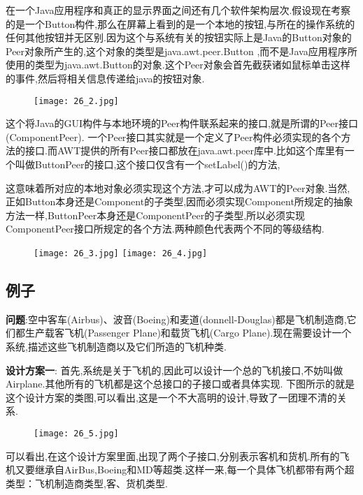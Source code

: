 \documentclass[../main.tex]{subfiles}
\begin{document}
在一个Java应用程序和真正的显示界面之间还有几个软件架构层次.假设现在考察的是一个Button构件,那么在屏幕上看到的是一个本地的按钮,与所在的操作系统的任何其他按钮并无区别.因为这个与系统有关的按钮实际上是Java的Button对象的Peer对象所产生的,这个对象的类型是java.awt.peer.Button ,而不是Java应用程序所使用的类型为java.awt.Button的对象.这个Peer对象会首先截获诸如鼠标单击这样的事件,然后将相关信息传递给java的按钮对象.
%
\begin{figure}[H]
  \texttt{[image: 26\_2.jpg]}
\end{figure}
%
这个将Java的GUI构件与本地环境的Peer构件联系起来的接口,就是所谓的Peer接口(ComponentPeer).
一个Peer接口其实就是一个定义了Peer构件必须实现的各个方法的接口.而AWT提供的所有Peer接口都放在java.awt.peer库中.比如这个库里有一个叫做ButtonPeer的接口,这个接口仅含有一个setLabel()的方法,

这意味着所对应的本地对象必须实现这个方法,才可以成为AWT的Peer对象.当然,正如Button本身还是Component的子类型,因而必须实现Component所规定的抽象方法一样,ButtonPeer本身还是ComponentPeer的子类型,所以必须实现ComponentPeer接口所规定的各个方法.两种颜色代表两个不同的等级结构.
%
\begin{figure}[H]
  \texttt{[image: 26\_3.jpg]}
  \texttt{[image: 26\_4.jpg]}
\end{figure}
%
\subsection{例子}
\noindent \textbf{问题}:空中客车(Airbus)、波音(Boeing)和麦道(donnell-Douglas)都是飞机制造商,它们都生产载客飞机(Passenger Plane)和载货飞机(Cargo Plane).现在需要设计一个系统,描述这些飞机制造商以及它们所造的飞机种类.

\noindent \textbf{设计方案一}:
首先,系统是关于飞机的,因此可以设计一个总的飞机接口,不妨叫做Airplane.其他所有的飞机都是这个总接口的子接口或者具体实现.
下图所示的就是这个设计方案的类图,可以看出,这是一个不大高明的设计,导致了一团理不清的关系.
%
\begin{figure}[H]
  \texttt{[image: 26\_5.jpg]}
\end{figure}
%
可以看出,在这个设计方案里面,出现了两个子接口,分别表示客机和货机.所有的飞机又要继承自AirBus,Boeing和MD等超类.这样一来,每一个具体飞机都带有两个超类型：飞机制造商类型,客、货机类型.
\end{document}
